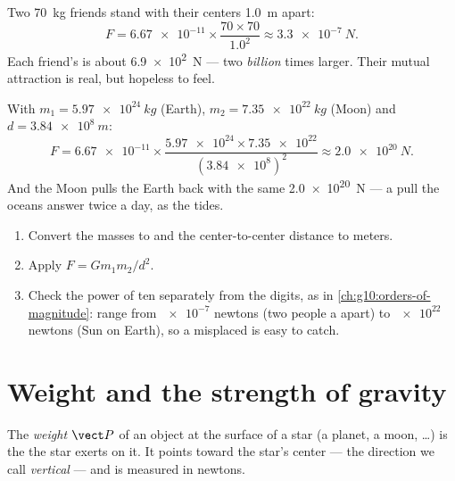 \begin{example}\label{ex:g10:universal-gravitation:friends}
Two \qty{70}{kg} friends stand with their centers \qty{1.0}{m} apart:
\[
F = \num{6.67e-11} \times \frac{70 \times 70}{1.0^2}
\approx \qty{3.3e-7}{N}.
\]
Each friend's  is about \qty{6.9e2}{N} --- two \emph{billion}
times larger. Their mutual attraction is real, but hopeless to feel.
\end{example}

\begin{example}\label{ex:g10:universal-gravitation:earthmoon}
With $m_1 = \qty{5.97e24}{kg}$ (Earth), $m_2 = \qty{7.35e22}{kg}$ (Moon)
and $d = \qty{3.84e8}{m}$:
\[
F = \num{6.67e-11} \times
\frac{\num{5.97e24} \times \num{7.35e22}}{(\num{3.84e8})^2}
\approx \qty{2.0e20}{N}.
\]
And the Moon pulls the Earth back with the same \qty{2.0e20}{N} --- a
pull the oceans answer twice a day, as the tides.
\end{example}

\begin{method}\label{met:g10:universal-gravitation:compute}
\begin{enumerate}
  \item Convert the masses to  and the center-to-center
        distance to meters.
  \item Apply $F = G m_1 m_2 / d^2$.
  \item Check the power of ten separately from the digits, as in
        \cref{ch:g10:orders-of-magnitude}:  range
        from $\num{e-7}$ newtons (two people a  apart) to $\num{e22}$ newtons
        (Sun on Earth), so a misplaced  is easy to catch.
\end{enumerate}
\end{method}

\section{Weight and the strength of gravity}

\begin{definition}[Weight]\label{def:g10:universal-gravitation:weight}
The \emph{weight} $\vect P$ of an object at the surface of
a star (a planet, a moon, \dots) is the  the star
exerts on it. It points toward the star's center --- the direction we
call \emph{vertical} --- and is measured in newtons.
\end{definition}

